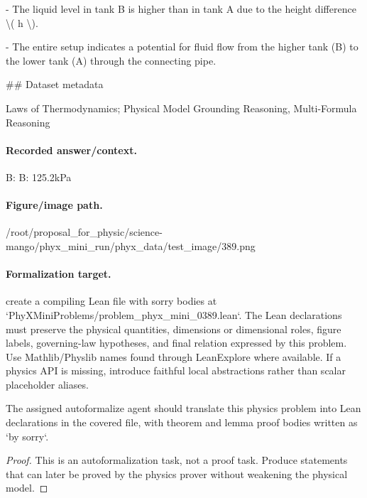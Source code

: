 - The liquid level in tank B is higher than in tank A due to the height difference \textbackslash{}( h \textbackslash{}).

- The entire setup indicates a potential for fluid flow from the higher tank (B) to the lower tank (A) through the connecting pipe.

\#\# Dataset metadata

Laws of Thermodynamics; Physical Model Grounding Reasoning, Multi-Formula Reasoning

\paragraph{Recorded answer/context.}
B: B: 125.2kPa

\paragraph{Figure/image path.}
/root/proposal\_for\_physic/science-mango/phyx\_mini\_run/phyx\_data/test\_image/389.png

\paragraph{Formalization target.}
create a compiling Lean file with sorry bodies at `PhyXMiniProblems/problem\_phyx\_mini\_0389.lean`. The Lean declarations must preserve the physical quantities, dimensions or dimensional roles, figure labels, governing-law hypotheses, and final relation expressed by this problem.
Use Mathlib/Physlib names found through LeanExplore where available. If a physics API is missing, introduce faithful local abstractions rather than scalar placeholder aliases.

\begin{theorem}
\label{thm:physics:phyx_mini_0389:target}
The assigned autoformalize agent should translate this physics problem into Lean declarations in the covered file, with theorem and lemma proof bodies written as `by sorry`.
\end{theorem}
\begin{proof}
This is an autoformalization task, not a proof task. Produce statements that can later be proved by the physics prover without weakening the physical model.
\end{proof}

